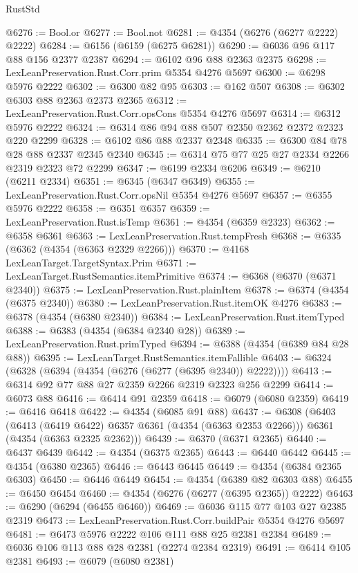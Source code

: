 \begin{lexlean}{RustStd}
\begin{coremodule}
@6276 := Bool.or
@6277 := Bool.not
@6281 := @4354 (@6276 (@6277 @2222) @2222)
@6284 := @6156 (@6159 (@6275 @6281))
@6290 := @6036 @96 @117 @88 @156 @2377 @2387
@6294 := @6102 @96 @88 @2363 @2375
@6298 := LexLeanPreservation.Rust.Corr.prim @5354 @4276 @5697
@6300 := @6298 @5976 @2222
@6302 := @6300 @82 @95
@6303 := @162 @507
@6308 := @6302 @6303 @88 @2363 @2373 @2365
@6312 := LexLeanPreservation.Rust.Corr.opsCons @5354 @4276 @5697
@6314 := @6312 @5976 @2222
@6324 := @6314 @86 @94 @88 @507 @2350 @2362 @2372 @2323 @220 @2299
@6328 := @6102 @86 @88 @2337 @2348
@6335 := @6300 @84 @78 @28 @88 @2337 @2345 @2340
@6345 := @6314 @75 @77 @25 @27 @2334 @2266 @2319 @2323 @72 @2299
@6347 := @6199 @2334 @6206
@6349 := @6210 (@6211 @2334)
@6351 := @6345 (@6347 @6349)
@6355 := LexLeanPreservation.Rust.Corr.opsNil @5354 @4276 @5697
@6357 := @6355 @5976 @2222
@6358 := @6351 @6357
@6359 := LexLeanPreservation.Rust.isTemp
@6361 := @4354 (@6359 @2323)
@6362 := @6358 @6361
@6363 := LexLeanPreservation.Rust.tempFresh
@6368 := @6335 (@6362 (@4354 (@6363 @2329 @2266)))
@6370 := @4168 LexLeanTarget.TargetSyntax.Prim
@6371 := LexLeanTarget.RustSemantics.itemPrimitive
@6374 := @6368 (@6370 (@6371 @2340))
@6375 := LexLeanPreservation.Rust.plainItem
@6378 := @6374 (@4354 (@6375 @2340))
@6380 := LexLeanPreservation.Rust.itemOK @4276
@6383 := @6378 (@4354 (@6380 @2340))
@6384 := LexLeanPreservation.Rust.itemTyped
@6388 := @6383 (@4354 (@6384 @2340 @28))
@6389 := LexLeanPreservation.Rust.primTyped
@6394 := @6388 (@4354 (@6389 @84 @28 @88))
@6395 := LexLeanTarget.RustSemantics.itemFallible
@6403 := @6324 (@6328 (@6394 (@4354 (@6276 (@6277 (@6395 @2340)) @2222))))
@6413 := @6314 @92 @77 @88 @27 @2359 @2266 @2319 @2323 @256 @2299
@6414 := @6073 @88
@6416 := @6414 @91 @2359
@6418 := @6079 (@6080 @2359)
@6419 := @6416 @6418
@6422 := @4354 (@6085 @91 @88)
@6437 := @6308
    (@6403
      (@6413 (@6419 @6422) @6357 @6361 (@4354 (@6363 @2353 @2266)))
      @6361
      (@4354 (@6363 @2325 @2362)))
@6439 := @6370 (@6371 @2365)
@6440 := @6437 @6439
@6442 := @4354 (@6375 @2365)
@6443 := @6440 @6442
@6445 := @4354 (@6380 @2365)
@6446 := @6443 @6445
@6449 := @4354 (@6384 @2365 @6303)
@6450 := @6446 @6449
@6454 := @4354 (@6389 @82 @6303 @88)
@6455 := @6450 @6454
@6460 := @4354 (@6276 (@6277 (@6395 @2365)) @2222)
@6463 := @6290 (@6294 (@6455 @6460))
@6469 := @6036 @115 @77 @103 @27 @2385 @2319
@6473 := LexLeanPreservation.Rust.Corr.buildPair @5354 @4276 @5697
@6481 := @6473 @5976 @2222 @106 @111 @88 @25 @2381 @2384
@6489 := @6036 @106 @113 @88 @28 @2381 (@2274 @2384 @2319)
@6491 := @6414 @105 @2381
@6493 := @6079 (@6080 @2381)

\end{coremodule}
\end{lexlean}
